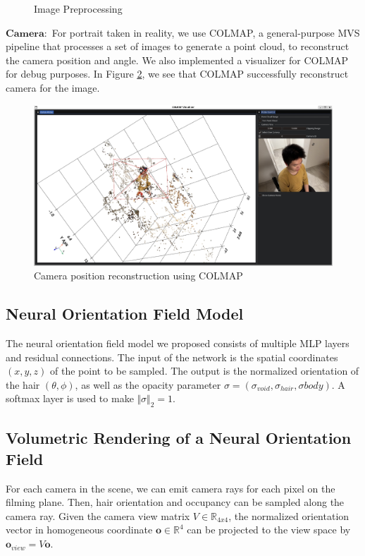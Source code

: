 \documentclass[12pt]{article}
\begin{document}
\begin{figure}[h]
        \caption{Image Preprocessing}
        \label{fig:image_prep}
    \end{figure}

    $\mathbf{Camera:}$ For portrait taken in reality, we use COLMAP, a general-purpose MVS pipeline that processes a set of images to generate a point cloud, to reconstruct the camera position and angle. We also implemented a visualizer for COLMAP for debug purposes. In Figure \ref{fig:colmap_demo}, we see that COLMAP successfully reconstruct camera for the image.
    \begin{figure}[h]
        \centering
        \includegraphics[width=0.5\linewidth]{project-milestone/images/colmap_demo.png}
        \caption{Camera position reconstruction using COLMAP}
        \label{fig:colmap_demo}
    \end{figure}

    \subsection{Neural Orientation Field Model}
    
    The neural orientation field model we proposed consists of multiple MLP layers and residual connections. The input of the network is the spatial coordinates $(x, y, z)$ of the point to be sampled. The output is the normalized orientation of the hair $(\theta, \phi)$, as well as the opacity parameter $\sigma = (\sigma_{void}, \sigma_{hair}, \sigma{body})$. A softmax layer is used to make $\Vert \sigma \Vert_{2} = 1$.

    \subsection{Volumetric Rendering of a Neural Orientation Field}

    For each camera in the scene, we can emit camera rays for each pixel on the filming plane. Then, hair orientation and occupancy can be sampled along the camera ray. Given the camera view matrix $V \in \mathbb{R}_{4x4}$, the normalized orientation vector in homogeneous coordinate $\mathbf{o} \in \mathbb{R}^{4}$ can be projected to the view space by $\mathbf{o}_{view} = V\mathbf{o}$.
\end{document}

